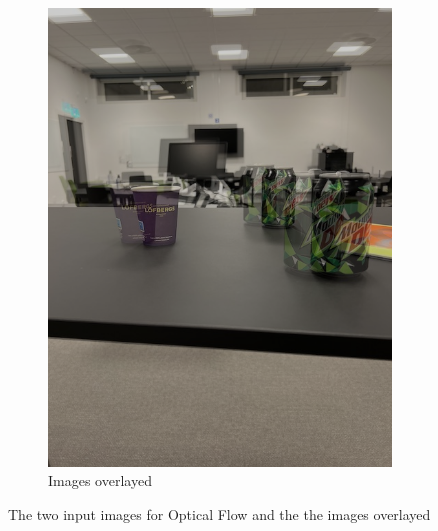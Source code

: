 \documentclass{article}
\begin{document}
\begin{figure}[H]
\begin{subfigure}{0.32\textwidth}
            \includegraphics[width=1\textwidth]{combined.png}
            \caption{Images overlayed}
            \label{fig:sub:flow-combined}
        \end{subfigure} 
        \caption{The two input images for Optical Flow and the the images overlayed} 
        \label{fig:flow-inputs} 
    \end{figure}
\end{document}
